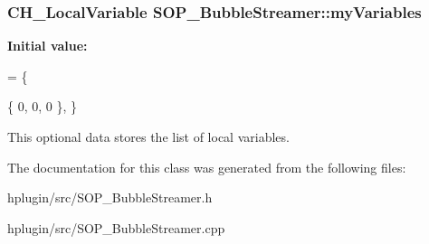 \subsubsection[{my\+Variables}]{\setlength{\rightskip}{0pt plus 5cm}C\+H\+\_\+\+Local\+Variable S\+O\+P\+\_\+\+Bubble\+Streamer\+::my\+Variables\hspace{0.3cm}{\ttfamily [static]}}\label{class_s_o_p___bubble_streamer_a0e2f6d167c4c5622b57ac21ba617fce4}
{\bfseries Initial value\+:}
\begin{DoxyCode}
= \{
  
  
  \{ 0, 0, 0 \},
\}
\end{DoxyCode}


This optional data stores the list of local variables. 



The documentation for this class was generated from the following files\+:\begin{DoxyCompactItemize}
\item 
hplugin/src/S\+O\+P\+\_\+\+Bubble\+Streamer.\+h\item 
hplugin/src/S\+O\+P\+\_\+\+Bubble\+Streamer.\+cpp\end{DoxyCompactItemize}
